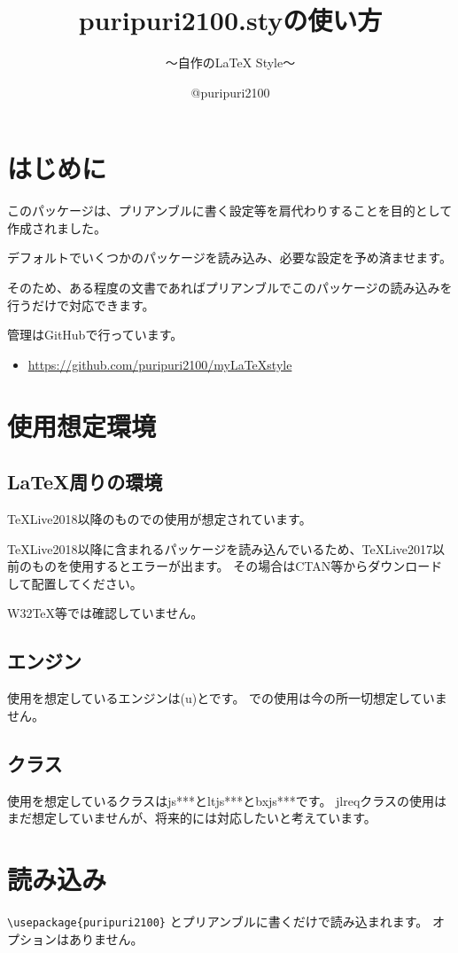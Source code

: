 \documentclass[lualatex,ja=standard,a4paper]{bxjsarticle}
\begin{document}
\title{\textsf{puripuri2100.sty}の使い方}
\subtitle{～自作の{\LaTeX} Style～}
\author{@puripuri2100}
\date{\puritoday}
\purimaketitle
\thispagestyle{fancy}


\section*{はじめに}
このパッケージは、プリアンブルに書く設定等を肩代わりすることを目的として作成されました。

デフォルトでいくつかのパッケージを読み込み、必要な設定を予め済ませます。

そのため、ある程度の文書であればプリアンブルでこのパッケージの読み込みを行うだけで対応できます。

管理はGitHubで行っています。
\begin{itemize}
\item \url{https://github.com/puripuri2100/myLaTeXstyle}
\end{itemize}

\section{使用想定環境}
\subsection{\LaTeX 周りの環境}
TeXLive2018以降のものでの使用が想定されています。

TeXLive2018以降に含まれるパッケージを読み込んでいるため、TeXLive2017以前のものを使用するとエラーが出ます。
その場合はCTAN等からダウンロードして配置してください。

W32TeX等では確認していません。

\subsection{エンジン}
使用を想定しているエンジンは(u)\pLaTeX と\LuaLaTeX です。
\XeLaTeX での使用は今の所一切想定していません。

\subsection{クラス}
使用を想定しているクラスはjs***とltjs***とbxjs***です。
jlreqクラスの使用はまだ想定していませんが、将来的には対応したいと考えています。

\section{読み込み}
\verb|\usepackage{puripuri2100}|
とプリアンブルに書くだけで読み込まれます。
オプションはありません。
\end{document}
